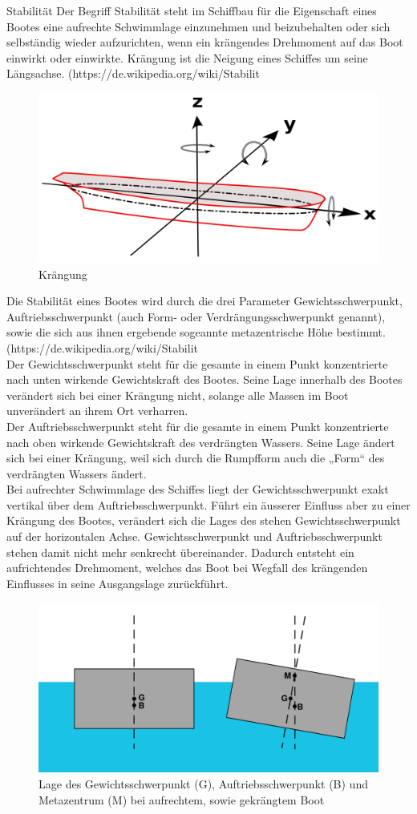 Stabilität
Der Begriff Stabilität steht im Schiffbau für die Eigenschaft eines Bootes eine aufrechte Schwimmlage einzunehmen und beizubehalten oder sich selbständig wieder aufzurichten, wenn ein krängendes Drehmoment auf das Boot einwirkt oder einwirkte. Krängung ist die Neigung eines Schiffes um seine Längsachse. (https://de.wikipedia.org/wiki/Stabilit%
\begin{figure}
    \centering
    \includegraphics[width=0.5\linewidth]{assets/Achsen_Schiffsbewegung.svg.png}
    \caption{Krängung}
    \label{fig:enter-label}
\end{figure}
Die Stabilität eines Bootes wird durch die drei Parameter Gewichtsschwerpunkt, Auftriebsschwerpunkt (auch Form- oder Verdrängungsschwerpunkt genannt), sowie die sich aus ihnen ergebende sogeannte metazentrische Höhe bestimmt. (https://de.wikipedia.org/wiki/Stabilit%
\\Der Gewichtsschwerpunkt steht für die gesamte in einem Punkt konzentrierte nach unten wirkende Gewichtskraft des Bootes. Seine Lage innerhalb des Bootes  verändert sich bei einer Krängung nicht, solange alle Massen im Boot unverändert an ihrem Ort verharren. \\
Der Auftriebsschwerpunkt steht für die gesamte in einem Punkt konzentrierte nach oben wirkende Gewichtskraft des verdrängten Wassers. Seine Lage ändert sich bei einer Krängung, weil sich durch die Rumpfform auch die „Form“ des verdrängten Wassers ändert.\\
Bei aufrechter Schwimmlage des Schiffes liegt der Gewichtsschwerpunkt exakt vertikal über dem Auftriebsschwerpunkt. Führt ein äusserer Einfluss aber zu einer Krängung des Bootes, verändert sich die Lages des  stehen Gewichtsschwerpunkt auf der horizontalen Achse. Gewichtsschwerpunkt und Auftriebsschwerpunkt stehen  damit nicht mehr senkrecht übereinander. Dadurch entsteht ein aufrichtendes Drehmoment, welches das Boot bei Wegfall des krängenden Einflusses in seine Ausgangslage zurückführt. 
\begin{figure}
    \centering
    \includegraphics[width=0.5\linewidth]{Metacentriskhojd-svg.svg.png}
    \caption{Lage des Gewichtsschwerpunkt (G), Auftriebsschwerpunkt (B) und Metazentrum (M) bei aufrechtem, sowie gekrängtem Boot }
    \label{fig:enter-label}
\end{figure}
